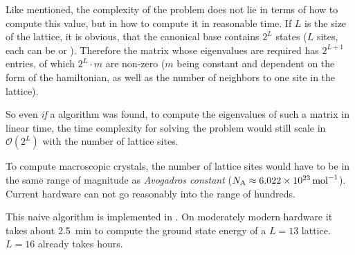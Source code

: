 Like mentioned, the complexity of the problem does not lie in terms of how to compute this value, but in how to compute it in reasonable time.
If $L$ is the size of the lattice, it is obvious, that the canonical base contains $2^L$ states ($L$ sites, each can be \up or \down).
Therefore the matrix whose eigenvalues are required has $2^{L+1}$ entries, of which $2^L \cdot m$ are non-zero ($m$ being constant and dependent on the form of the hamiltonian, as well as the number of neighbors to one site in the lattice). 

So even \emph{if} a algorithm was found, to compute the eigenvalues of such a matrix in linear time, the time complexity for solving the problem would still scale in $\mathcal{O} (2^L)$ with the number of lattice sites.

To compute macroscopic crystals, the number of lattice sites would have to be in the same range of magnitude as \emph{Avogadros constant} ($N_\mathrm{A} \approx \SI{6.022E23}{\per\mol}$). Current hardware can not go reasonably into the range of hundreds. 

This naive algorithm is implemented in \cite{selfPhysics} . On moderately modern hardware it takes about \SI{2.5}{\minute} to compute the ground state energy of a $L=13$ lattice. $L=16$ already takes hours.